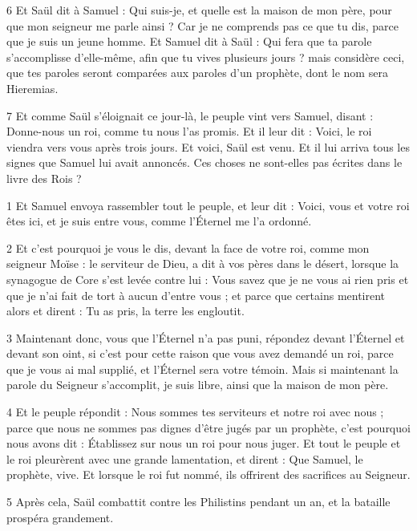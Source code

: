 \par 6 Et Saül dit à Samuel : Qui suis-je, et quelle est la maison de mon père, pour que mon seigneur me parle ainsi ? Car je ne comprends pas ce que tu dis, parce que je suis un jeune homme. Et Samuel dit à Saül : Qui fera que ta parole s'accomplisse d'elle-même, afin que tu vives plusieurs jours ? mais considère ceci, que tes paroles seront comparées aux paroles d'un prophète, dont le nom sera Hieremias.

\par 7 Et comme Saül s'éloignait ce jour-là, le peuple vint vers Samuel, disant : Donne-nous un roi, comme tu nous l'as promis. Et il leur dit : Voici, le roi viendra vers vous après trois jours. Et voici, Saül est venu. Et il lui arriva tous les signes que Samuel lui avait annoncés. Ces choses ne sont-elles pas écrites dans le livre des Rois ?


\par 1 Et Samuel envoya rassembler tout le peuple, et leur dit : Voici, vous et votre roi êtes ici, et je suis entre vous, comme l'Éternel me l'a ordonné.

\par 2 Et c'est pourquoi je vous le dis, devant la face de votre roi, comme mon seigneur Moïse : le serviteur de Dieu, a dit à vos pères dans le désert, lorsque la synagogue de Core s'est levée contre lui : Vous savez que je ne vous ai rien pris et que je n'ai fait de tort à aucun d'entre vous ; et parce que certains mentirent alors et dirent : Tu as pris, la terre les engloutit.

\par 3 Maintenant donc, vous que l'Éternel n'a pas puni, répondez devant l'Éternel et devant son oint, si c'est pour cette raison que vous avez demandé un roi, parce que je vous ai mal supplié, et l'Éternel sera votre témoin. Mais si maintenant la parole du Seigneur s'accomplit, je suis libre, ainsi que la maison de mon père.

\par 4 Et le peuple répondit : Nous sommes tes serviteurs et notre roi avec nous ; parce que nous ne sommes pas dignes d'être jugés par un prophète, c'est pourquoi nous avons dit : Établissez sur nous un roi pour nous juger. Et tout le peuple et le roi pleurèrent avec une grande lamentation, et dirent : Que Samuel, le prophète, vive. Et lorsque le roi fut nommé, ils offrirent des sacrifices au Seigneur.

\par 5 Après cela, Saül combattit contre les Philistins pendant un an, et la bataille prospéra grandement.

